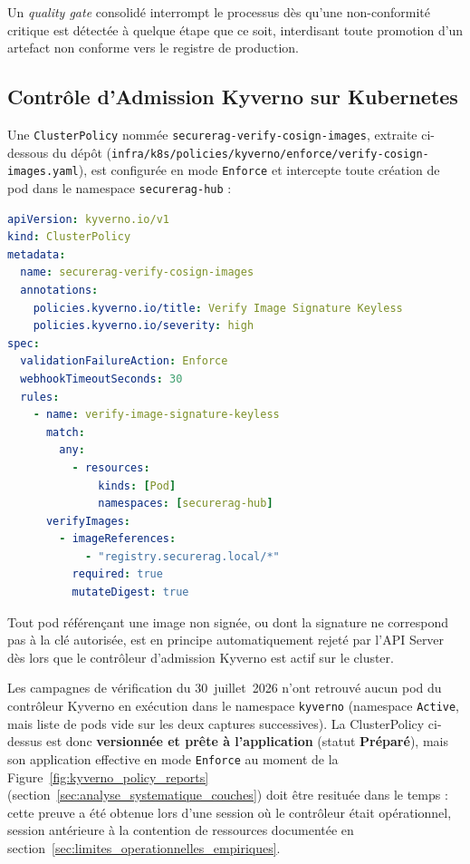 Un \textit{quality gate} consolidé interrompt le processus dès qu'une non-conformité critique est détectée à quelque étape que ce soit, interdisant toute promotion d'un artefact non conforme vers le registre de production.

\subsection{Contrôle d'Admission Kyverno sur Kubernetes}

Une \texttt{ClusterPolicy} nommée \texttt{securerag-verify-cosign-images}, extraite ci-dessous du dépôt (\texttt{infra/k8s/policies/kyverno/enforce/verify-cosign-images.yaml}), est configurée en mode \texttt{Enforce} et intercepte toute création de pod dans le namespace \texttt{securerag-hub} :

\begin{lstlisting}[language=yaml, caption={Extrait réel de la ClusterPolicy Kyverno de vérification de signature keyless}, label={lst:kyverno_policy_reelle}]
apiVersion: kyverno.io/v1
kind: ClusterPolicy
metadata:
  name: securerag-verify-cosign-images
  annotations:
    policies.kyverno.io/title: Verify Image Signature Keyless
    policies.kyverno.io/severity: high
spec:
  validationFailureAction: Enforce
  webhookTimeoutSeconds: 30
  rules:
    - name: verify-image-signature-keyless
      match:
        any:
          - resources:
              kinds: [Pod]
              namespaces: [securerag-hub]
      verifyImages:
        - imageReferences:
            - "registry.securerag.local/*"
          required: true
          mutateDigest: true
\end{lstlisting}

Tout pod référençant une image non signée, ou dont la signature ne correspond pas à la clé autorisée, est en principe automatiquement rejeté par l'API Server dès lors que le contrôleur d'admission Kyverno est actif sur le cluster.

\begin{tcolorbox}[colback=LightGray!30, colframe=orange!70!black, arc=3pt,
    title={\small\bfseries Précision temporelle ajoutée sur l'état de Kyverno}]
\footnotesize
Les campagnes de vérification du 30~juillet~2026 n'ont retrouvé aucun pod du contrôleur Kyverno en exécution dans le namespace \texttt{kyverno} (namespace \texttt{Active}, mais liste de pods vide sur les deux captures successives). La ClusterPolicy ci-dessus est donc \textbf{versionnée et prête à l'application} (statut \textbf{Préparé}), mais son application effective en mode \texttt{Enforce} au moment de la Figure~\ref{fig:kyverno_policy_reports} (section~\ref{sec:analyse_systematique_couches}) doit être resituée dans le temps : cette preuve a été obtenue lors d'une session où le contrôleur était opérationnel, session antérieure à la contention de ressources documentée en section~\ref{sec:limites_operationnelles_empiriques}.
\end{tcolorbox}

